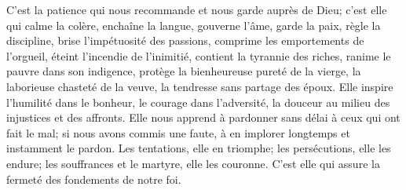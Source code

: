 C’est la patience qui nous recommande et nous garde auprès de Dieu;
	c’est elle qui calme la colère, enchaîne la langue,
	gouverne l’âme, garde la paix,
	règle la discipline, brise l’impétuosité des passions,
	comprime les emportements de l’orgueil, éteint l’incendie de l’inimitié,
	contient la tyrannie des riches, ranime le pauvre dans son indigence,
	protège la bienheureuse pureté de la vierge,
	la laborieuse chasteté de la veuve,
	la tendresse sans partage des époux.
Elle inspire l’humilité dans le bonheur, le courage dans l’adversité,
	la douceur au milieu des injustices et des affronts.
Elle nous apprend à pardonner sans délai à ceux qui ont fait le mal;
	si nous avons commis une faute,
	à en implorer longtemps et instamment le pardon.
Les tentations, elle en triomphe;
	les persécutions, elle les endure;
	les souffrances et le martyre, elle les couronne.
C’est elle qui assure la fermeté des fondements de notre foi.
